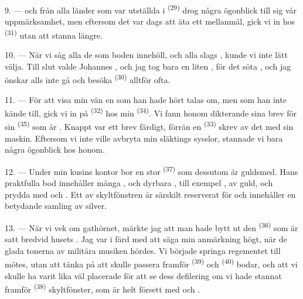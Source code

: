 \VUsaut{3.0mm}

9. ---  och  från alla länder som var utställda i
 \textsuperscript{(29)}  drog några ögonblick till sig
vår uppmärksamhet, men eftersom det var dags att äta ett mellanmål, gick vi in hos
 \textsuperscript{(31)} utan att stanna längre.

10. --- När vi såg alla de  som boden innehöll,
 och alla slags ,
kunde vi inte lätt välja. Till slut valde Johannes , och jag tog bara en
liten , för det söta , och jag önskar alls
inte gå och besöka  \textsuperscript{(30)} alltför ofta.

\VUsaut{3.0mm}

11. --- För att visa min vän en  som han hade hört talas om, men som han
inte kände till, gick vi in på  \textsuperscript{(32)} hos min 
\textsuperscript{(34)}. Vi fann honom dikterande sina brev för sin 
\textsuperscript{(35)} som är . Knappt var ett brev färdigt, förrän en
 \textsuperscript{(33)} skrev av det med sin maskin.
Eftersom vi inte ville avbryta min släktings sysslor, stannade vi bara några ögonblick hos
honom.

12. --- Under min kusins kontor bor en stor 
\textsuperscript{(37)} som dessutom är guldsmed. Hans praktfulla bod innehåller många
,  och dyrbara
, till exempel ,  av guld,
 och  prydda med  och
. Ett av skyltfönstren är särskilt reserverat för
 och innehåller en betydande samling 
av silver.

13. --- När vi vek om gathörnet, märkte jag att man hade bytt ut den
 \textsuperscript{(36)} som är satt bredvid husets
. Jag var i färd med att säga min anmärkning högt, när de
glada tonerna av  militära musiken hördes. Vi började springa regementet till
mötes, utan att tänka på att  skulle passera framför
 \textsuperscript{(39)} och 
\textsuperscript{(40)} bodar, och att vi skulle ha varit lika väl placerade för att se dess
defilering om vi hade stannat framför  \textsuperscript{(38)} skyltfönster,
som är helt försett med
 och .

